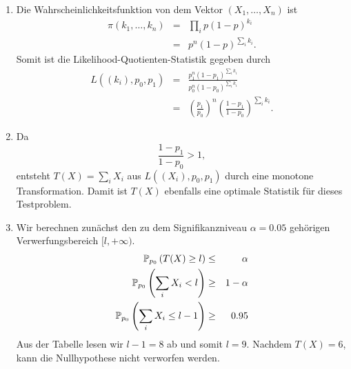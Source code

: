 \solution
\begin{enumerate}
    \item Die Wahrscheinlichkeitsfunktion von dem Vektor $\left( X_1, \ldots, X_n \right)$ ist
        \begin{eqnarray*}
            \pi\left( k_1, \ldots, k_n \right) &=& \prod_i p(1-p)^{k_i} \\
            &=& p^n (1-p)^{\sum_{i}^{} k_i}.
        \end{eqnarray*}
        Somit ist die Likelihood-Quotienten-Statistik gegeben durch
        \begin{eqnarray*}
            L( (k_i), p_0, p_1) &=& \frac{p_1^n (1-p_1)^{\sum_{i} k_i}}{ p_0^n (1-p_0)^{\sum_{i} k_i}} \\
            &=& \left( \frac{p_1}{p_0} \right)^n \left( \frac{1-p_1}{1-p_0} \right)^{\sum_{i} k_i}.
        \end{eqnarray*}
    \item Da 
        \begin{equation*}
            \frac{1-p_1}{1-p_0} > 1,
        \end{equation*}
        entsteht $T(X) = \sum_{i}^{} X_i$ aus $L( (X_i), p_0, p_1 )$ durch eine monotone Transformation.
        Damit ist $T(X)$ ebenfalls eine optimale Statistik für dieses Testproblem.
    \item Wir berechnen zunächst den zu dem Signifikanzniveau $\alpha=0.05$ gehörigen Verwerfungsbereich
        $[l, +\infty)$. 
        \begin{eqnarray*}
            \mathbb P_{p_0} \left( T(X) \geq l \right) & \leq & \alpha \\
            \mathbb P_{p_0} \left( \sum_{i}^{} X_i < l \right) & \geq & 1-\alpha \\ 
            \mathbb P_{p_0} \left( \sum_{i}^{} X_i \leq l-1 \right) & \geq & 0.95 \\ 
        \end{eqnarray*}
        Aus der Tabelle lesen wir $l-1=8$ ab und somit $l=9$. Nachdem $T(X)=6$, kann die Nullhypothese
        nicht verworfen werden.
\end{enumerate}







